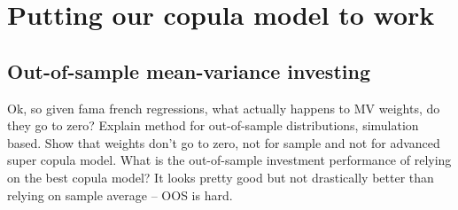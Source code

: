 
\section{Putting our copula model to work}
\label{sec:model_work}



\subsection{Out-of-sample mean-variance investing}
\label{subsec:mean_variance}

Ok, so given fama french regressions, what actually happens to MV weights, do they go to zero? Explain method for out-of-sample distributions, simulation based. Show that weights don't go to zero, not for sample and not for advanced super copula model. What is the out-of-sample investment performance of relying on the best copula model? It looks pretty good but not drastically better than relying on sample average -- OOS is hard.


